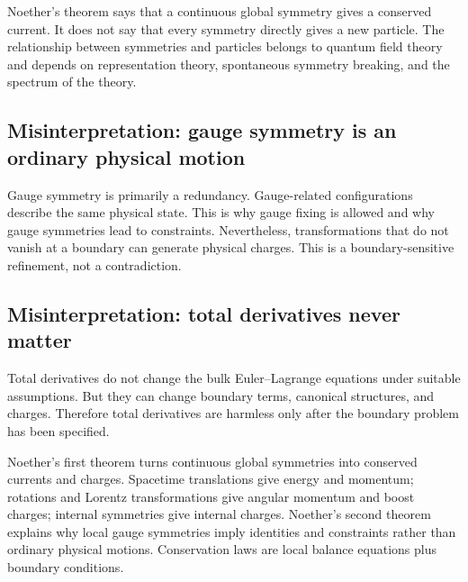 Noether's theorem says that a continuous global symmetry gives a conserved
current. It does not say that every symmetry directly gives a new particle. The
relationship between symmetries and particles belongs to quantum field theory
and depends on representation theory, spontaneous symmetry breaking, and the
spectrum of the theory.

\subsection*{Misinterpretation: gauge symmetry is an ordinary physical motion}

Gauge symmetry is primarily a redundancy. Gauge-related configurations describe
the same physical state. This is why gauge fixing is allowed and why gauge
symmetries lead to constraints. Nevertheless, transformations that do not vanish
at a boundary can generate physical charges. This is a boundary-sensitive
refinement, not a contradiction.

\subsection*{Misinterpretation: total derivatives never matter}

Total derivatives do not change the bulk Euler--Lagrange equations under
suitable assumptions. But they can change boundary terms, canonical structures,
and charges. Therefore total derivatives are harmless only after the boundary
problem has been specified.

\begin{summarybox}
Noether's first theorem turns continuous global symmetries into conserved
currents and charges. Spacetime translations give energy and momentum; rotations
and Lorentz transformations give angular momentum and boost charges; internal
symmetries give internal charges. Noether's second theorem explains why local
gauge symmetries imply identities and constraints rather than ordinary physical
motions. Conservation laws are local balance equations plus boundary conditions.
\end{summarybox}
